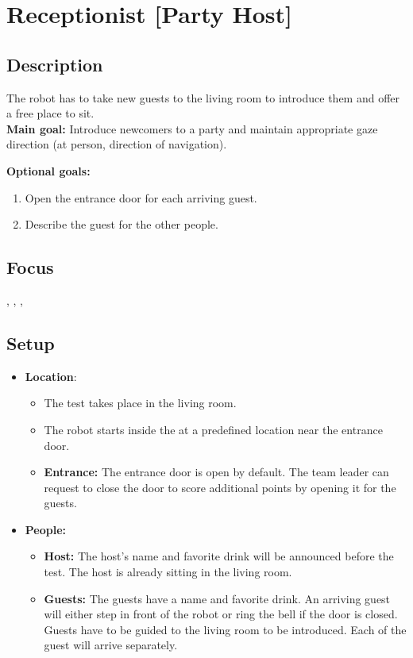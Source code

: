 \section{Receptionist [Party Host]}
\label{test:receptionist}
\subsection*{Description}
The robot has to take new guests to the living room to introduce them and offer a free place to sit.\\
    
\textbf{Main goal:}
    Introduce newcomers to a party and maintain appropriate gaze direction (at person, direction of navigation).

\textbf{Optional goals:}
\begin{enumerate}[nosep]
	\item Open the entrance door for each arriving guest.
	\item Describe the guest for the other people.
\end{enumerate}

\subsection*{Focus}
\SysI{}, \HRI{}, \PerDet{}, \PerRec

\subsection*{Setup}
\begin{itemize}
	\item \textbf{Location}: 
	\begin{itemize}
	\item The test takes place in the living room.	
	\item The robot starts inside the \Arena{} at a predefined location near the entrance door.
	\item \textbf{Entrance:} The entrance door is open by default. The team leader can request to close the door to score additional points by opening it for the guests.
	\end{itemize}
	
	\item \textbf{People:} 
	\begin{itemize}
	\item \textbf{Host:} The host's name and favorite drink will be announced before the test. The host is already sitting in the living room.

	\item \textbf{Guests:} The guests have a name and favorite drink. An arriving guest will either step in front of the robot or ring the bell if the door is closed. Guests have to be guided to the living room to be introduced. Each of the guest will arrive separately. 
	\end{itemize}

\end{itemize}

